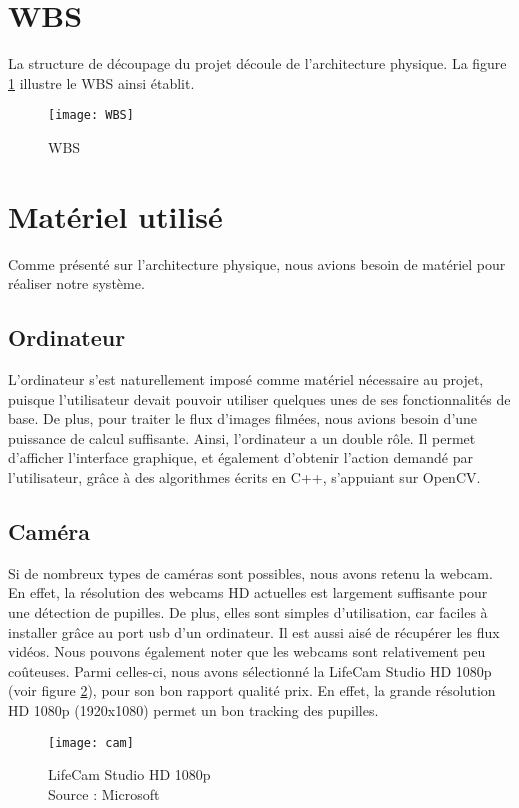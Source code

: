 \section{WBS}
La structure de découpage du projet découle de l'architecture physique. La figure \ref{fig:WBS} illustre le WBS ainsi établit. 

\begin{figure}[H]
  \centering
  \texttt{[image: WBS]}
  \caption{WBS}
  \label{fig:WBS}
\end{figure}

\section{Matériel utilisé}

Comme présenté sur l'architecture physique, nous avions besoin de matériel pour réaliser notre système.

\subsection{Ordinateur}
L'ordinateur s'est naturellement imposé comme matériel nécessaire au projet, puisque l'utilisateur devait pouvoir utiliser quelques unes de ses fonctionnalités de base. De plus, pour traiter le flux d'images filmées, nous avions besoin d'une puissance de calcul suffisante. Ainsi, l'ordinateur a un double rôle. Il permet d'afficher l'interface graphique, et également d'obtenir l'action demandé par l'utilisateur, grâce à des algorithmes écrits en C++, s'appuiant sur OpenCV. 

\subsection{Caméra}
Si de nombreux types de caméras sont possibles, nous avons retenu la webcam. En effet, la résolution des webcams HD actuelles est largement suffisante pour une détection de pupilles. De plus, elles sont simples d'utilisation, car faciles à installer grâce au port usb d'un ordinateur. Il est aussi aisé de récupérer les flux vidéos. Nous pouvons également noter que les webcams sont relativement peu coûteuses.
Parmi celles-ci, nous avons sélectionné la LifeCam Studio HD 1080p (voir figure \ref{fig:Cam}), pour son bon rapport qualité prix. En effet, la grande résolution HD 1080p (1920x1080) permet un bon tracking des pupilles.

\begin{figure}[H]
  \centering
  \texttt{[image: cam]}
  \caption{LifeCam Studio HD 1080p \\Source : Microsoft}
  \label{fig:Cam}
\end{figure}

